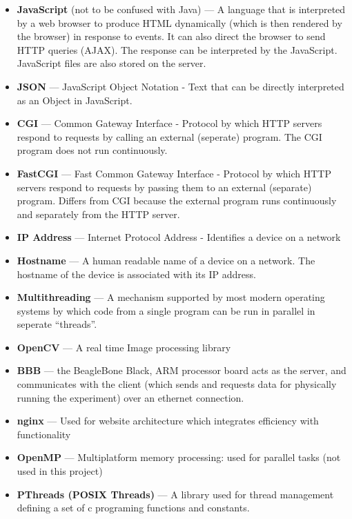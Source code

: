 \begin{itemize}
	\item {\bf JavaScript} (not to be confused with Java) --- A language that is interpreted by a web browser to produce HTML dynamically (which is then rendered by the browser) in response to events. It can also direct the browser to send HTTP queries (AJAX). The response can be interpreted by the JavaScript. JavaScript files are also stored on the server.
	\item {\bf JSON} --- JavaScript Object Notation - Text that can be directly interpreted as an Object in JavaScript.
	\item {\bf CGI} --- Common Gateway Interface - Protocol by which HTTP servers respond to requests by calling an external (seperate) program. The CGI program does not run continuously.
	\item {\bf FastCGI} --- Fast Common Gateway Interface - Protocol by which HTTP servers respond to requests by passing them to an external (separate) program. Differs from CGI because the external program runs continuously and separately from the HTTP server.
	\item {\bf IP Address} --- Internet Protocol Address - Identifies a device on a network
	\item {\bf Hostname} --- A human readable name of a device on a network. The hostname of the device is associated with its IP address.
	\item {\bf Multithreading} --- A mechanism supported by most modern operating systems by which code from a single program can be run in parallel in seperate ``threads''.
	\item {\bf OpenCV} --- A real time Image processing library
	\item {\bf BBB} --- the BeagleBone Black, ARM processor board acts as the server, and communicates with the client (which sends and requests data for physically running the experiment) over an ethernet connection. 
	\item {\bf nginx} --- Used for website architecture which integrates efficiency with functionality
	\item {\bf OpenMP} --- Multiplatform memory processing: used for parallel tasks (not used in this project) 
	\item {\bf PThreads (POSIX Threads)} --- A library used for thread management defining a set of c programing functions and constants. 
\end{itemize}
